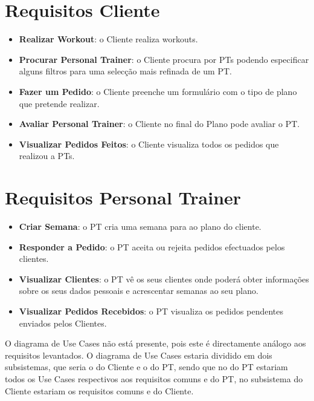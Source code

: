 \section{Requisitos Cliente}
\label{sec:requisitoscliente}

\begin{itemize}
    \item \textbf{Realizar Workout}: o Cliente realiza workouts.
    
    \item \textbf{Procurar Personal Trainer}: o Cliente procura por PTs podendo especificar alguns filtros para uma selecção mais refinada de um PT.
    
    \item \textbf{Fazer um Pedido}: o Cliente preenche um formulário com o tipo de plano que pretende realizar.
    
    \item \textbf{Avaliar Personal Trainer}: o Cliente no final do Plano pode avaliar o PT.
    
    \item \textbf{Visualizar Pedidos Feitos}: o Cliente visualiza todos os pedidos que realizou a PTs.
    
\end{itemize}

\section{Requisitos Personal Trainer}
\label{sec:requisitospt}

\begin{itemize}
    \item \textbf{Criar Semana}: o PT cria uma semana para ao plano do cliente.
    
    \item \textbf{Responder a Pedido}: o PT aceita ou rejeita pedidos efectuados pelos clientes.
    
    \item \textbf{Visualizar Clientes}: o PT vê os seus clientes onde poderá obter informações sobre os seus dados pessoais e acrescentar semanas ao seu plano.
    
    \item \textbf{Visualizar Pedidos Recebidos}: o PT visualiza os pedidos pendentes enviados pelos Clientes.
    
\end{itemize}

\hspace{5mm} O diagrama de Use Cases não está presente, pois este é directamente análogo aos requisitos levantados. O diagrama de Use Cases estaria dividido em dois subsistemas, que seria o do Cliente e o do PT, sendo que no do PT estariam todos os Use Cases respectivos aos requisitos comuns e do PT, no subsistema do Cliente estariam os requisitos comuns e do Cliente.
